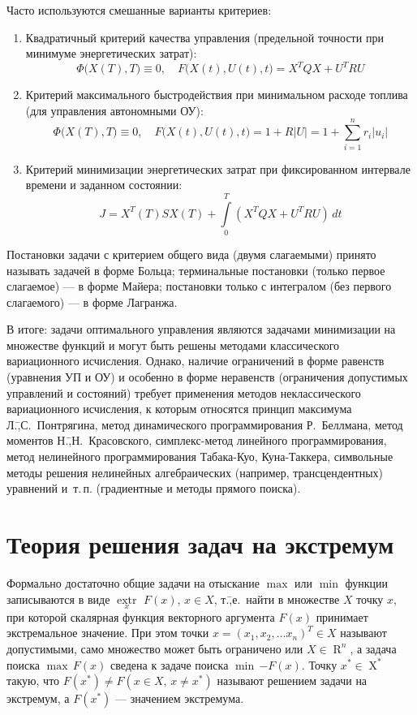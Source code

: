 \documentclass[preprint,russian,a5paper,10pt,twoside,mediummath]{ncc}
\begin{document}
Часто используются смешанные варианты критериев:
\begin{enumerate}[resume]
\item Квадратичный критерий качества управления (предельной точности при минимуме энергетических затрат):
\[ \Phi \bigl( X(T), T \bigr) \equiv 0, \quad F \bigl( X(t), U(t), t \bigr) = X^TQX + U^TRU \]
\item Критерий максимального быстродействия при минимальном расходе топлива (для управления автономными ОУ):
\[ \Phi \bigl( X(T), T \bigr) \equiv 0, \quad F \bigl( X(t), U(t), t \bigr) = 1 + R\left|U\right| = 1 + \sum\limits_{i=1}^{n}{ r_i \left| u_i \right| } \]
\item Критерий минимизации энергетических затрат при фиксированном интервале времени и заданном состоянии: 
\[ J = X^T \left( T \right) S X \left( T \right) + \int\limits_0^T \left( X^TQX + U^TRU \right) \, dt \] 
\end{enumerate}

Постановки задачи с критерием общего вида (двумя слагаемыми) принято называть задачей в форме Больца; терминальные постановки (только первое слагаемое) --- в форме Майера; постановки только с интегралом (без первого слагаемого) --- в форме Лагранжа.

В итоге: задачи оптимального управления являются задачами минимизации на множестве функций и могут быть решены методами классического вариационного исчисления. Однако, наличие ограничений в форме равенств (уравнения УП и ОУ) и особенно в форме неравенств (ограничения допустимых управлений и состояний) требует применения методов неклассического вариационного исчисления, к которым относятся принцип максимума Л.\=,С.~Понтрягина, метод динамического программирования Р.~Беллмана, метод моментов Н.\=,Н.~Красовского, симплекс-метод линейного программирования, метод нелинейного программирования Табака-Куо, Куна-Таккера, символьные методы решения нелинейных алгебраических (например, трансцендентных) уравнений и~т.\,п. (градиентные и методы прямого поиска).





\clearpage
\section{Теория решения задач на экстремум\label{extremum}}
Формально достаточно общие задачи на отыскание $\max$  или $\min$ функции записываются в виде $\underset{x}{\mathop{extr}}\,\,F\left( x \right)$, $x\in X$, т.\=,е.~найти в множестве $X$ точку $x$, при которой скалярная функция векторного аргумента $F\left( x \right)$ принимает экстремальное значение. При этом точки $ x = {\left( x_1, x_2, \dots x_n \right)}^T \in X$ называют допустимыми, само множество может быть ограничено или $ X \in \mathop{R}^n $, а задача поиска $ \max \, F\left( x \right) $ сведена к задаче поиска $ \min \, { - F \left( x \right) }$. Точку $ x^* \in \mathop{X}^* $ такую, что $ F \left( x^* \right) \ne F\left( x\in X,\,x\ne {{x}^{*}} \right)$ называют решением задачи на экстремум, а $ F \left( x^* \right) $ --- значением экстремума.
\end{document}
